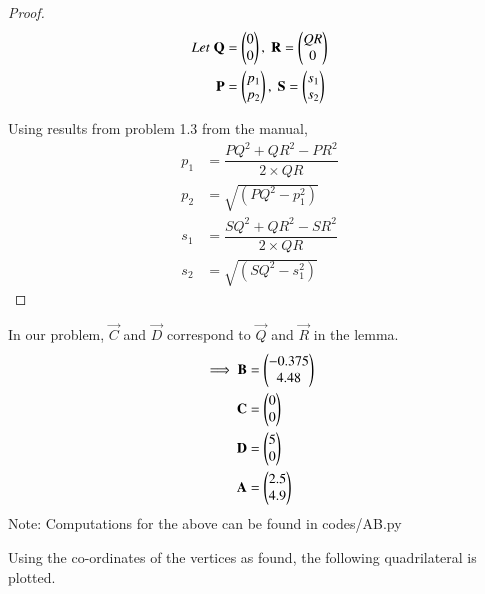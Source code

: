\documentclass[journal,12pt,twocolumn]{IEEEtran}
\begin{document}
\begin{proof}
    \begin{align}
        Let\; \mathbf{Q} &= \begin{pmatrix}0\\0\end{pmatrix},\; \mathbf{R} = \begin{pmatrix}QR\\0\end{pmatrix}\\
        \mathbf{P} &= \begin{pmatrix}p_1\\p_2\end{pmatrix},\; \mathbf{S} = \begin{pmatrix}s_1\\s_2\end{pmatrix}
    \end{align}
        
    Using results from problem 1.3 from the manual, 
    \begin{align}
        p_1 &= \dfrac{PQ^2+QR^2-PR^2}{2\times QR}\\
        p_2 &= \sqrt{(PQ^2-p_1^2)}\\
        s_1 &= \dfrac{SQ^2+QR^2-SR^2}{2\times QR}\\
        s_2 &= \sqrt{(SQ^2-s_1^2)}
    \end{align}
\end{proof}

In our problem, $\vec{C}$ and $\vec{D}$ correspond to $\vec{Q}$ and $\vec{R}$ in the lemma. 
\begin{align}
    \implies \mathbf{B} &= \begin{pmatrix}-0.375\\4.48\end{pmatrix}\\
        \mathbf{C} &= \begin{pmatrix}0\\0\end{pmatrix}\\
        \mathbf{D} &= \begin{pmatrix}5\\0\end{pmatrix}\\
        \mathbf{A} &= \begin{pmatrix}2.5\\4.9\end{pmatrix}
\end{align}
Note: Computations for the above can be found in codes/AB.py

Using the co-ordinates of the vertices as found, the following quadrilateral is plotted.
\begin{figure}[h]
\end{figure}
\end{document}
